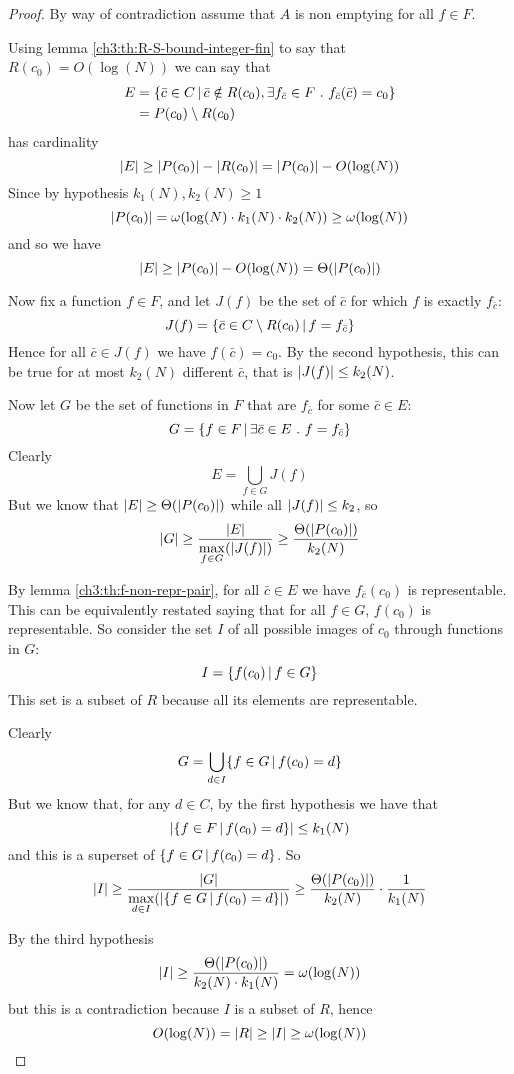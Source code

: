 \begin{proof}
	By way of contradiction assume that $A$ is non emptying for all $f \in F$.

	Using lemma \ref{ch3:th:R-S-bound-integer-fin} to say that $R(c_0) = O(\log(N))$ we can say that
	\begin{align*}
		E &= \{ \bar{c} \in C \,\vert\, \bar{c} \notin R(c_0), \exists f_{\bar{c}} \in F\ .\ f_{\bar{c}}(\bar{c}) = c_0 \} \\
		&= P(c_0) \setminus R(c_0)
	\end{align*}
	has cardinality
	\[
	\lvert E\rvert \ge \lvert P(c_0)\rvert - \lvert R(c_0)\rvert = \lvert P(c_0)\rvert - O(\log(N))
	\]
	Since by hypothesis $k_1(N), k_2(N) \ge 1$
	\[
	\lvert P(c_0)\rvert = \omega(\log(N) \cdot k_1(N) \cdot k_2(N)) \ge \omega(\log(N))
	\]
	and so we have
	\[
	\lvert E\rvert \ge \lvert P(c_0)\rvert - O(\log(N)) = \Theta(\lvert P(c_0)\rvert)
	\]

	Now fix a function $f \in F$, and let $J(f)$ be the set of $\bar{c}$ for which $f$ is exactly $f_{\bar{c}}$:
	\[
	J(f) = \{ \bar{c} \in C \setminus R(c_0) \,\vert\, f = f_{\bar{c}} \}
	\]
	Hence for all $\bar{c} \in J(f)$ we have $f(\bar{c}) = c_0$. By the second hypothesis, this can be true for at most $k_2(N)$ different $\bar{c}$, that is $\lvert J(f)\rvert \le k_2(N)$.

	Now let $G$ be the set of functions in $F$ that are $f_{\bar{c}}$ for some $\bar{c} \in E$:
	\[
	G = \{ f \in F \,\vert\, \exists \bar{c} \in E\ .\ f = f_{\bar{c}} \}
	\]
	Clearly
	\[
	E = \bigcup\limits_{f \in G} J(f)
	\]
	But we know that $\lvert E\rvert \ge \Theta(\lvert P(c_0)\rvert)$ while all $\lvert J(f)\rvert \le k_2$, so
	\[
	\lvert G\rvert \ge \frac{\lvert E\rvert}{\max\limits_{f \in G}(\lvert J(f)\rvert)} \ge \frac{\Theta(\lvert P(c_0)\rvert)}{k_2(N)}
	\]

	By lemma \ref{ch3:th:f-non-repr-pair}, for all $\bar{c} \in E$ we have $f_{\bar{c}}(c_0)$ is representable. This can be equivalently restated saying that for all $f \in G$, $f(c_0)$ is representable.
	So consider the set $I$ of all possible images of $c_0$ through functions in $G$:
	\[
	I = \{ f(c_0) \,\vert\, f \in G \}
	\]
	This set is a subset of $R$ because all its elements are representable.

	Clearly
	\[
	G = \bigcup\limits_{d \in I} \{ f \in G \,\vert\, f(c_0) = d \}
	\]
	But we know that, for any $d \in C$, by the first hypothesis we have that
	\[
	\lvert\{ f \in F \,\vert\, f(c_0) = d \}\rvert \le k_1(N)
	\]
	and this is a superset of $\{ f \in G \,\vert\, f(c_0) = d \}$. So
	\[
	\lvert I\rvert \ge \frac{\lvert G\rvert}{\max\limits_{d \in I} (\lvert\{ f \in G \,\vert\, f(c_0) = d \}\rvert)} \ge \frac{\Theta(\lvert P(c_0)\rvert)}{k_2(N)} \cdot \frac{1}{k_1(N)}
	\]

	By the third hypothesis
	\[
	\lvert I\rvert \ge \frac{\Theta(\lvert P(c_0)\rvert)}{k_2(N) \cdot  k_1(N)} = \omega(\log(N))
	\]
	but this is a contradiction because $I$ is a subset of $R$, hence
	\[
	O(\log(N)) = \lvert R\rvert \ge \lvert I\rvert \ge \omega(\log(N))
	\]
\end{proof}
